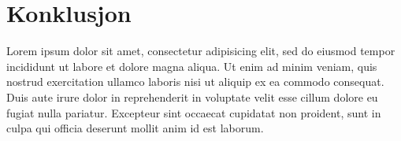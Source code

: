 \documentclass[5p,a4paper,english]{elsarticle}%
\begin{document}
\section{Konklusjon}
Lorem ipsum dolor \cite{dirac} sit amet, consectetur adipisicing elit, sed do eiusmod tempor incididunt ut labore et dolore magna aliqua. Ut enim ad minim veniam, quis nostrud exercitation ullamco laboris nisi ut aliquip ex ea commodo consequat. Duis aute irure dolor in reprehenderit in voluptate velit esse cillum dolore eu fugiat nulla pariatur. Excepteur sint occaecat cupidatat non proident, sunt in culpa qui officia deserunt mollit anim id est laborum.
	


\end{document}
